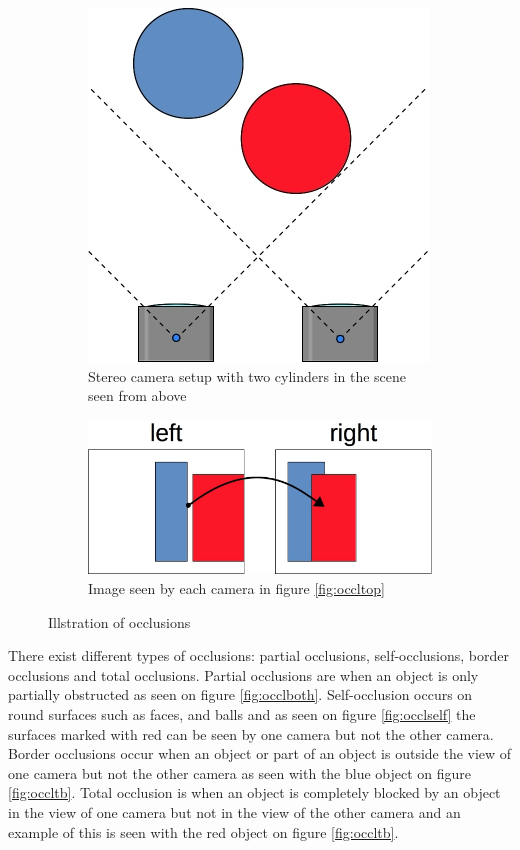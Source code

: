 \begin{figure}[ht]
  \centering
  \begin{subfigure}[t]{0.45\textwidth}
    \centering\includegraphics[scale=0.4]{figures/occltop.jpg}
    \caption{Stereo camera setup with two cylinders in the scene seen from above\label{fig:occltop}}
  \end{subfigure}\hspace{0.5cm}
  \begin{subfigure}[t]{0.45\textwidth}
    \centering\includegraphics[scale=0.4]{figures/occl2view}
    \caption{Image seen by each camera in figure \vref{fig:occltop}\label{fig:occl2view}}
  \end{subfigure}
  \caption{Illstration of occlusions\label{fig:occlboth}}
\end{figure}

There exist different types of occlusions: partial occlusions, self-occlusions, border occlusions and total occlusions. Partial occlusions are when an object is only partially obstructed as seen on figure \vref{fig:occlboth}. Self-occlusion occurs on round surfaces such as faces, and balls and as seen on figure \vref{fig:occlself} the surfaces marked with red can be seen by one camera but not the other camera. Border occlusions occur when an object or part of an object is outside the view of one camera but not the other camera as seen with the blue object on figure \ref{fig:occltb}. Total occlusion is when an object is completely blocked by an object in the view of one camera but not in the view of the other camera and an example of this is seen with the red object on figure \vref{fig:occltb}.\\

